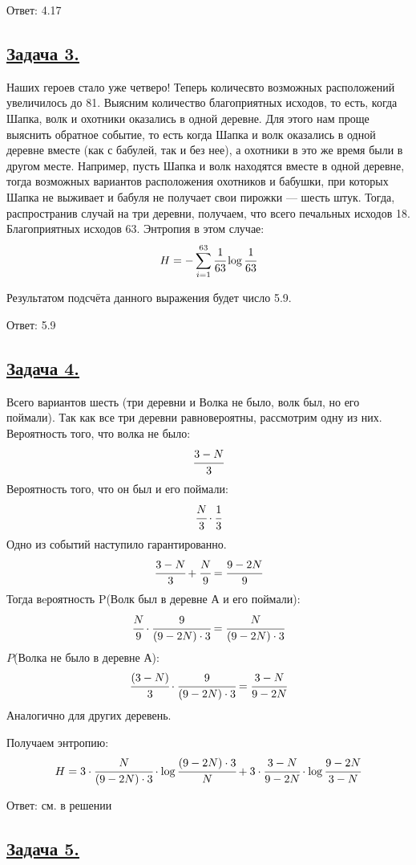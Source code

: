 Ответ: 4.17

\subsection*{\hyperref[sec:problem3]{Задача 3.}}\label{sec:sol_problem3}

Наших героев стало уже четверо! Теперь количесвто возможных расположений увеличилось до 81. Выясним количество благоприятных исходов, то есть, когда Шапка, волк и охотники оказались в одной деревне. Для этого нам проще выяснить обратное событие, то есть когда Шапка и волк оказались в одной деревне вместе (как с бабулей, так и без нее), а охотники в это же время были в другом месте. Например, пусть Шапка и волк находятся вместе в одной деревне, тогда возможных вариантов расположения охотников и бабушки, при которых Шапка не выживает и бабуля не получает свои пирожки --- шесть штук. Тогда, распространив случай  на три деревни, получаем, что всего печальных исходов 18. Благоприятных исходов 63. Энтропия в этом случае: 
\[H=-\sum\limits_{i=1}^{63}  \cfrac{1}{63}\log \cfrac{1}{63} \]

Результатом подсчёта данного выражения будет число 5.9.

Ответ: 5.9

\subsection*{\hyperref[sec:problem4]{Задача 4.}}\label{sec:sol_problem4}

Всего вариантов шесть (три деревни и {Волка не было, волк был, но его поймали}). Так как все три деревни равновероятны, рассмотрим одну из них. Вероятность того, что волка не было: \[\cfrac{3-N}{3} \]
Вероятность того, что он был и его поймали: \[\cfrac{N}{3}\cdot \cfrac{1}{3} \]
Одно из событий наступило гарантированно. 
\[\cfrac{3-N}{3} + \cfrac{N}{9} = \cfrac{9-2N}{9} \]
Тогда вeроятность P(Волк был в деревне А и его поймали):
\[\cfrac{N}{9}\cdot \cfrac{9}{(9-2N)\cdot3} =\cfrac{N}{(9-2N)\cdot3} \] 
$P$(Волка не было в деревне А):
\[\cfrac{(3-N)}{3}\cdot \cfrac{9}{(9-2N)\cdot3}=\cfrac{3-N}{9-2N}\]
Аналогично для других деревень.

Получаем энтропию:
\[H=3\cdot \cfrac{N}{(9-2N)\cdot3}\cdot \log \cfrac{(9-2N)\cdot3}{N}+3\cdot\cfrac{3-N}{9-2N}\cdot \log \cfrac{9-2N}{3-N}  \]

Ответ: см. в решении

\subsection*{\hyperref[sec:problem5]{Задача 5.}}\label{sec:sol_problem5}

